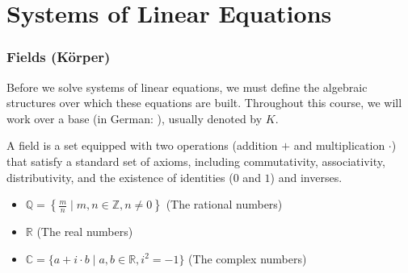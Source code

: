 \setcounter{chapter}{4}
\renewcommand{\thetheorem}{\thechapter.\arabic{theorem}}
\setcounter{theorem}{0}

\chapter{Systems of Linear Equations}

\subsection{Fields (Körper)}

Before we solve systems of linear equations, we must define the algebraic structures over which these equations are built. Throughout this course, we will work over a base  (in German: ), usually denoted by $K$. 

A field is a set equipped with two operations (addition $+$ and multiplication $\cdot$) that satisfy a standard set of axioms, including commutativity, associativity, distributivity, and the existence of identities ($0$ and $1$) and inverses.

\begin{example}
\begin{itemize}
    \item $\mathbb{Q} = \left\{\frac{m}{n} \mid m, n \in \mathbb{Z}, n \ne 0\right\}$ (The rational numbers)
    \item $\mathbb{R}$ (The real numbers)
    \item $\mathbb{C} = \{a + i \cdot b \mid a, b \in \mathbb{R}, i^2 = -1\}$ (The complex numbers)
\end{itemize}
\end{example}

